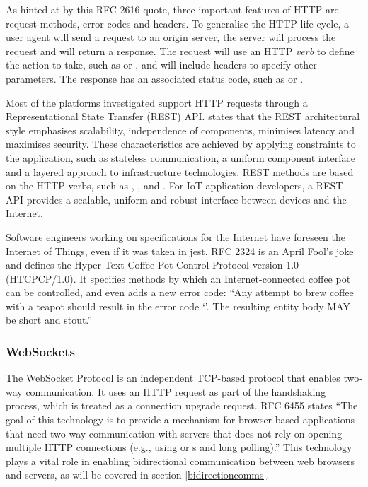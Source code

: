         As hinted at by this RFC 2616 quote, three important features of HTTP are request methods, error codes and headers. To generalise the HTTP life cycle, a user agent will send a request to an origin server, the server will process the request and will return a response. The request will use an HTTP \emph{verb} to define the action to take, such as  or , and will include headers to specify other parameters. The response has an associated status code, such as  or .

        Most of the platforms investigated support HTTP requests through a Representational State Transfer (REST) API. \citet{rest:2000} states that the REST architectural style emphasises scalability, independence of components, minimises latency and maximises security. These characteristics are achieved by applying constraints to the application, such as stateless communication, a uniform component interface and a layered approach to infrastructure technologies. REST methods are based on the HTTP verbs, such as , ,  and . For IoT application developers, a REST API provides a scalable, uniform and robust interface between devices and the Internet.

        Software engineers working on specifications for the Internet have foreseen the Internet of Things, even if it was taken in jest. RFC 2324 \citep{rfc2324} is an April Fool's joke and defines the Hyper Text Coffee Pot Control Protocol version 1.0 (HTCPCP/1.0). It specifies methods by which an Internet-connected coffee pot can be controlled, and even adds a new error code: ``Any attempt to brew coffee with a teapot should result in the error code `'. The resulting entity body MAY be short and stout.''

      \subsubsection{WebSockets}
        The WebSocket Protocol is an independent TCP-based protocol that enables two-way communication. It uses an HTTP request as part of the handshaking process, which is treated as a connection upgrade request. RFC 6455 \citep{rfc6455} states ``The goal of this technology is to provide a mechanism for browser-based applications that need two-way communication with servers that does not rely on opening multiple HTTP connections (e.g., using  or s and long polling).'' This technology plays a vital role in enabling bidirectional communication between web browsers and servers, as will be covered in section \ref{bidirectioncomms}.

